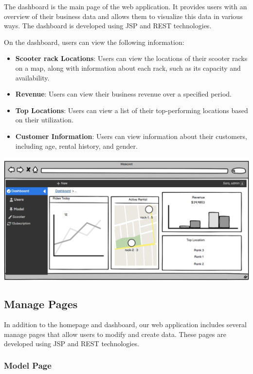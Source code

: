 The dashboard is the main page of the web application. It provides users with an overview of their business data and allows them to visualize this data in various ways. The dashboard is developed using JSP and REST technologies.

On the dashboard, users can view the following information:

\begin{itemize}
\item \textbf{Scooter rack Locations}: Users can view the locations of their scooter racks on a map, along with information about each rack, such as its capacity and availability.
\item \textbf{Revenue}: Users can view their business revenue over a specified period.
\item \textbf{Top Locations}: Users can view a list of their top-performing locations based on their utilization.
\item \textbf{Customer Information}: Users can view information about their customers, including age, rental history, and gender.
\end{itemize}

\includegraphics[scale = 0.6]{sections/DLL/Dashboard.png}

\subsection{Manage Pages}

In addition to the homepage and dashboard, our web application includes several manage pages that allow users to modify and create data. These pages are developed using JSP and REST technologies.

\subsubsection{Model Page}

